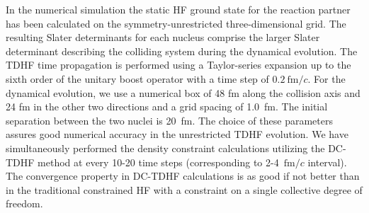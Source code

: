 In the numerical simulation the static HF ground state for the reaction partner has been calculated on the symmetry-unrestricted three-dimensional grid.
The resulting Slater determinants for each nucleus comprise the larger Slater determinant describing the colliding system during the dynamical evolution.
The TDHF time propagation is performed using a Taylor-series expansion up to the sixth order of the unitary boost operator with
a time step of $0.2 ~\mathrm {fm}/c$. For the dynamical evolution, we use a numerical box of 48 fm along the collision axis and 24 fm in the
other two directions and a grid spacing of 1.0~fm. The initial separation between the two nuclei is 20~fm. The choice of these
parameters assures good numerical accuracy in the unrestricted TDHF evolution. We have simultaneously performed the density constraint
calculations utilizing the DC-TDHF method at every 10-20 time steps (corresponding to 2-4~$\mathrm {fm}/c$ interval).
The convergence property in DC-TDHF calculations is as good if
not better than in the traditional constrained HF with a constraint on a single collective degree of freedom.

